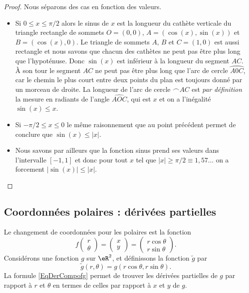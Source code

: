 \begin{proof}
        Nous séparons des cas en fonction des valeurs.
    \begin{itemize}
    \item Si $0\leq x\leq \pi/2$ alors le sinus de $x$ est la longueur du cathète verticale du triangle rectangle de sommets $O = (0,0)$, $A = (\cos(x), \sin(x))$ et $B = (\cos(x), 0)$. Le triangle de sommets $A$, $B$ et $C = (1, 0)$ est aussi rectangle et nous savons que chacun des cathètes ne peut pas être plus long que l'hypoténuse. Donc $\sin(x)$ est inférieur à la longueur du segment $AC$. À son tour le segment $AC$ ne peut pas être plus long que l'arc de cercle $\wideparen{A0C}$, car le chemin le plus court entre deux points du plan est toujours donné par un morceau de droite. La longueur de l'arc de cercle $\frown{AC}$ est \emph{par définition} la mesure en radiants de l'angle $\widehat{AOC}$, qui est $x$ et on a l'inégalité $\sin(x)\leq x$.
    \item Si $-\pi/2\leq x\leq 0$ le m\^eme raisonnement que au point précédent permet de conclure que $\sin(x)\leq |x|$.
    \item Nous savons par ailleurs que la fonction sinus prend ses valeurs dans l'intervalle $[-1,1]$ et donc pour tout $x$ tel que $|x|\geq \pi/2 \equiv 1,57\ldots$ on a forcement $|\sin(x)|\leq |x|$.
    \end{itemize}
\end{proof}

\subsection{Coordonnées polaires : dérivées partielles}

Le changement de coordonnées pour les polaires est la fonction
\begin{equation}
    f\begin{pmatrix}
        r    \\
        \theta
    \end{pmatrix}=\begin{pmatrix}
        x    \\
        y
    \end{pmatrix}=\begin{pmatrix}
        r\cos\theta    \\
        r\sin\theta
    \end{pmatrix}.
\end{equation}
Considérons une fonction $g$ sur $\eR^2$, et définissons la fonction $\tilde g$ par
\begin{equation}
    \tilde g(r,\theta)=g(r\cos\theta,r\sin\theta).
\end{equation}
La formule \eqref{EqDerCompofg} permet de trouver les dérivées partielles de $g$ par rapport à $r$ et $\theta$ en termes de celles par rapport à $x$ et $y$ de $g$.

